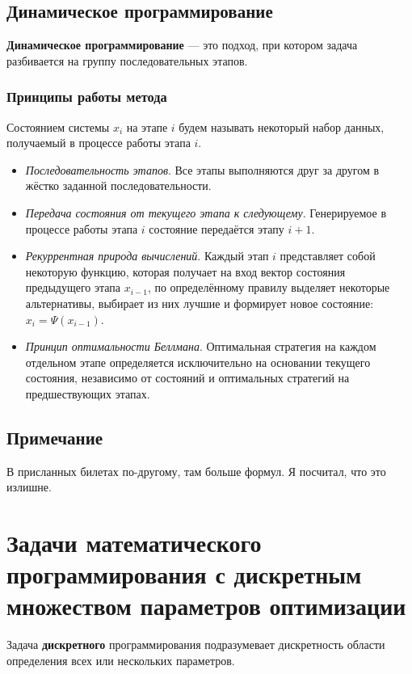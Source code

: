 \documentclass[17pt]{extarticle}
\begin{document}
\subsection{Динамическое программирование}

\textbf{Динамическое программирование} — это подход, при котором задача разбивается на группу последовательных этапов.

\subsubsection{Принципы работы метода}
Состоянием системы \( x_i \) на этапе \( i \) будем называть некоторый набор данных, получаемый в процессе работы этапа \( i \).

\begin{itemize}
    \item \textit{Последовательность этапов}. Все этапы выполняются друг за другом в жёстко заданной последовательности.
    \item \textit{Передача состояния от текущего этапа к следующему}. Генерируемое в процессе работы этапа \( i \) состояние передаётся этапу \( i+1 \).
    \item \textit{Рекуррентная природа вычислений}. Каждый этап \( i \) представляет собой некоторую функцию, которая получает на вход вектор состояния предыдущего этапа \( x_{i-1} \), по определённому правилу выделяет некоторые альтернативы, выбирает из них лучшие и формирует новое состояние: \( x_i = \Psi(x_{i-1}) \).
    \item \textit{Принцип оптимальности Беллмана}. Оптимальная стратегия на каждом отдельном этапе определяется исключительно на основании текущего состояния, независимо от состояний и оптимальных стратегий на предшествующих этапах.
\end{itemize}

\subsection{Примечание}
В присланных билетах по-другому, там больше формул. Я посчитал, что это излишне.




\section{Задачи математического программирования с дискретным множеством параметров оптимизации}

Задача \textbf{дискретного} программирования подразумевает дискретность области определения всех или нескольких параметров.
\end{document}
